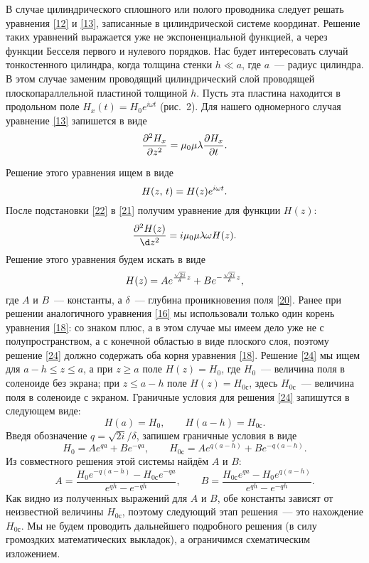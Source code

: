 В случае цилиндрического сплошного или полого проводника следует решать уравнения \eqref{12} и \eqref{13}, записанные в
цилиндрической системе координат. Решение таких уравнений выражается уже не экспоненциальной функцией, а через функции
Бесселя первого и нулевого порядков. Нас будет интересовать случай тонкостенного цилиндра, когда толщина стенки $h\ll a$,
где $a$~--- радиус цилиндра. В этом случае заменим проводящий цилиндрический слой проводящей плоскопараллельной пластиной
толщиной $h$. Пусть эта пластина находится в продольном поле $H_x(t)=H_0e^{i\omega t}$ (рис.~2). Для нашего одномерного случая
уравнение \eqref{13} запишется в виде
\begin{equation} \eqmark{21}
\frac{\partial^2H_x}{\partial z^2}=\mu_0\mu\lambda\ddt{H_x}.
\end{equation}



Решение этого уравнения ищем в виде
\begin{equation} \eqmark{22}
H(z,\,t)=H(z)e^{i\omega t}.
\end{equation}
После подстановки \eqref{22} в \eqref{21} получим уравнение для функции $H(z)$:
\begin{equation} \eqmark{23}
\frac{\partial^2H(z)}{\d z^2}=i\mu_0\mu\lambda\omega H(z).
\end{equation}
Решение этого уравнения будем искать в виде
\begin{equation} \eqmark{24}
H(z)=Ae^{\frac{\sqrt{2i}}{\delta}z}+Be^{-\frac{\sqrt{2i}}{\delta}z},
\end{equation}
где $A$ и $B$~--- константы, а $\delta$~--- глубина проникновения поля \eqref{20}. Ранее при решении аналогичного
уравнения \eqref{16} мы использовали только один корень уравнения \eqref{18}: со знаком плюс, а в этом случае мы имеем дело
уже не с полупространством, а с конечной областью в виде плоского слоя, поэтому решение \eqref{24} должно содержать оба
корня уравнения \eqref{18}. Решение \eqref{24} мы ищем для $a-h\le z\le a$, а при $z\ge a$ поле $H(z)=H_0$, где $H_0$~---
величина поля в соленоиде без экрана; при $z\le a-h$ поле $H(z)=H_{0с}$, здесь $H_{0с}$~--- величина поля в соленоиде с
экраном. Граничные условия для решения \eqref{24} запишутся в следующем виде:
\[
H(a)=H_0,\qquad H(a-h)=H_{0с}.
\]
Введя обозначение $q=\sqrt{2i}/\delta$, запишем граничные условия в виде
\[
H_0=Ae^{qa}+Be^{-qa},\qquad H_{0с}=Ae^{q(a-h)}+Be^{-q(a-h)}.
\]
Из совместного решения этой системы найдём $A$ и $B$:
\[
A=\frac{H_0e^{-q(a-h)}-H_{0с}e^{-qa}}{e^{qh}-e^{-qh}},\qquad B=\frac{H_{0с}e^{qa}-H_0e^{q(a-h)}}{e^{qh}-e^{-qh}}.
\]
Как видно из полученных выражений для $A$ и $B$, обе константы зависят от неизвестной величины $H_{0с}$, поэтому
следующий этап решения~--- это нахождение $H_{0с}$. Мы не будем проводить дальнейшего подробного решения (в силу
громоздких математических выкладок), а ограничимся схематическим изложением.

